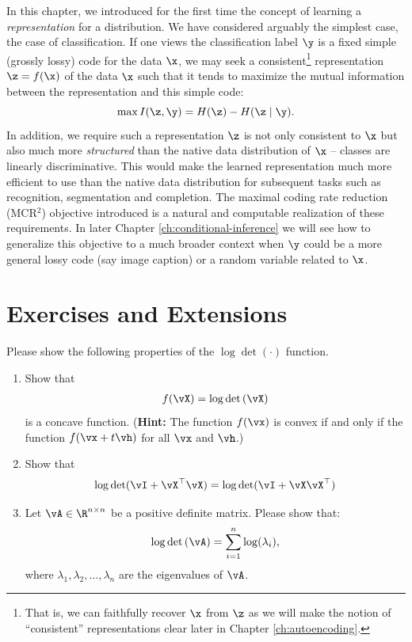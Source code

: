 \documentclass[../../book-main.tex]{subfiles}
\begin{document}
In this chapter, we introduced for the first time the concept of learning a {\em representation} for a distribution. We have considered arguably the simplest case, the case of classification. If one views the classification label $\y$ is a fixed simple (grossly lossy) code for the data $\x$, we may seek a consistent\footnote{That is, we can faithfully recover $\x$ from $\z$ as we will make the notion of ``consistent'' representations clear later in Chapter \ref{ch:autoencoding}.} representation $\z = f(\x)$ of the data $\x$ such that it tends to maximize the mutual information between the representation and this simple code:
\begin{equation}
    \max I(\z, \y) = H(\z) - H(\z \mid \y).
\end{equation}
In addition, we require such a representation $\z$ is not only consistent to $\x$ but also much more {\em structured} than the native data distribution of $\x$ -- classes are linearly discriminative. This would make the learned representation much more efficient to use than the native data distribution for subsequent tasks such as recognition, segmentation and completion. The maximal coding rate reduction (MCR$^2$) objective introduced is a natural and computable realization of these requirements. In later Chapter \ref{ch:conditional-inference} we will see how to generalize this objective to a much broader context when $\y$ could be a more general lossy code (say image caption) or a random variable related to $\x$.


\section{Exercises and Extensions}




\begin{exercise}
	Please show the following properties of the  $\log\det(\cdot)$ function.
	\begin{enumerate}
		\item Show that
		      \begin{align*}
			      f(\vX) = \log\det\left(\vX\right)
		      \end{align*}
		      is a concave function. ({\bf Hint:} The function $f(\vx)$ is convex if and only if the function $f(\vx+t\vh)$ for all $\vx$ and $\vh$.)

		\item Show that
		      \begin{align*}
			      \log\det(\vI + \vX^\top\vX) = \log\det(\vI + \vX\vX^\top)
		      \end{align*}

		\item Let $\vA \in \R^{n\times n}$ be a positive definite matrix. Please show that:
		      \begin{align}
			      \log\det\left(\vA \right) = \sum_{i=1}^n \log(\lambda_i),
		      \end{align}
		      where $\lambda_1,\lambda_2,\dots,\lambda_n$ are the eigenvalues of $\vA$.
	\end{enumerate}


\end{exercise}
\end{document}

